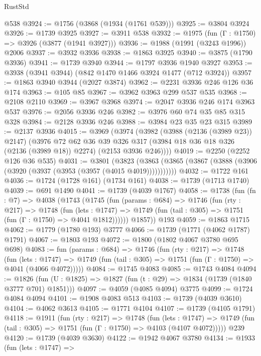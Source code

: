 \begin{lexlean}{RustStd}
\begin{coremodule}
    @538
@3924 := @1756 (@3868 (@1934 (@1761 @539)))
@3925 := @3804 @3924
@3926 := @1739 @3925
@3927 := @3911 @538
@3932 := @1975 (fun (Γ : @1750) => @3926 (@3877 (@1941 @3927)))
@3936 := @1988 (@1991 (@3243 @1996)) @2006
@3937 := @3932 @3936
@3938 := @1863 @3925
@3940 := @3875 (@1790 @3936)
@3941 := @1739 @3940
@3944 := @1797 @3936 @1940 @3927
@3953 := @3938 (@3941 @3944) (@842 @1470 @1466 @3924 @1477 (@712 @3924))
@3957 := @1863 @3940 @3944 (@2027 @3874)
@3962 := @2231 @3936 @246 @126 @36 @174
@3963 := @105 @85
@3967 := @3962 @3963 @299 @537 @535
@3968 := @2108 @2110
@3969 := @3967 @3968
@3974 := @2047 @3936 @246 @174 @3963 @537
@3976 := @2056 @3936 @246
@3982 := @3976 @60 @74 @35 @85 @315 @328
@3984 := @2128 @3936 @246
@3988 := @3984 @23 @35 @23 @315
@3989 := @2137 @3936
@4015 := @3969
    (@3974
      (@3982
        (@3988 (@2136 (@3989 @23)) @2147)
        (@3976
          @72
          @62
          @36
          @39
          @326
          @317
          (@3984 @18 @36 @18 @326 (@2136 (@3989 @18)) @2274)
          (@2153 @3936 @246))))
@4019 := @2250 (@2252 @126 @36 @535)
@4031 := @3801
    (@3823 (@3863 (@3865 (@3867 (@3888 (@3906 (@3920 (@3937 (@3953 (@3957 (@4015 @4019)))))))))))
@4032 := @1722 @161
@4036 := @1724 (@1728 @161) (@1734 @161)
@4038 := @1739 (@1713 @1740)
@4039 := @691 @1490
@4041 := @1739 (@4039 @1767)
@4058 := @1738
    (fun (fn : @7) =>
    @4038
      (@1743
        (@1745
          (fun (params : @684) =>
          @1746
            (fun (rty : @217) =>
            @1748
              (fun (lets : @1747) =>
              @1749 (fun (tail : @305) => @1751 (fun (Γ : @1750) => @4041 @1812))))))
        @1857))
    @193
@4059 := @1863 @1715
@4062 := @1779 (@1780 @193) @3777
@4066 := @1739 (@1771 (@4062 @1787) @1791)
@4067 := @1803 @193
@4072 := @1800 (@1802 @4067 @3780 @695 @698)
@4083 := fun (params : @684) =>
  @1746
    (fun (rty : @217) =>
    @1748
      (fun (lets : @1747) =>
      @1749 (fun (tail : @305) => @1751 (fun (Γ : @1750) => @4041 (@4066 @4072)))))
@4084 := @1745 @4083
@4085 := @1743 @4084
@4094 := @1826 (fun (U : @1825) => @1827 (fun (t : @29) => @1834 (@1739 (@1840 @3777 @701) @1851)))
@4097 := @4059 (@4085 @4094) @3775
@4099 := @1724 @4084 @4094
@4101 := @1908 @4083 @513
@4103 := @1739 (@4039 @3610)
@4104 := @4062 @3613
@4105 := @1771 @4104
@4107 := @1739 (@4105 @1791)
@4118 := @1911
    (fun (rty : @217) =>
    @1748
      (fun (lets : @1747) =>
      @1749 (fun (tail : @305) => @1751 (fun (Γ : @1750) => @4103 (@4107 @4072)))))
    @239
@4120 := @1739 (@4039 @3630)
@4122 := @1942 @4067 @3780
@4134 := @1933
    (fun (lets : @1747) =>

\end{coremodule}
\end{lexlean}

